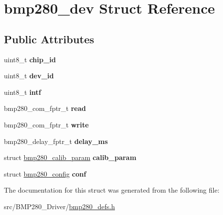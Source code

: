 \hypertarget{structbmp280__dev}{}\section{bmp280\+\_\+dev Struct Reference}
\label{structbmp280__dev}
\subsection*{Public Attributes}
\begin{DoxyCompactItemize}
\item 
\mbox{\label{structbmp280__dev_aad8e96e1b90095d7d29c304d1fd0eb7a}} 
uint8\+\_\+t {\bfseries chip\+\_\+id}
\item 
\mbox{\label{structbmp280__dev_a5904c4abdafcd25119f66872545af03a}} 
uint8\+\_\+t {\bfseries dev\+\_\+id}
\item 
\mbox{\label{structbmp280__dev_a086483a3cc1664868dbcc08bd84e5396}} 
uint8\+\_\+t {\bfseries intf}
\item 
\mbox{\label{structbmp280__dev_adb818ed44dfda1d195e99d7aa1752a38}} 
bmp280\+\_\+com\+\_\+fptr\+\_\+t {\bfseries read}
\item 
\mbox{\label{structbmp280__dev_a36c3231949d1a581274f92761da14bcf}} 
bmp280\+\_\+com\+\_\+fptr\+\_\+t {\bfseries write}
\item 
\mbox{\label{structbmp280__dev_ae854c30200407497fd96ce73ae2762a9}} 
bmp280\+\_\+delay\+\_\+fptr\+\_\+t {\bfseries delay\+\_\+ms}
\item 
\mbox{\label{structbmp280__dev_ade764b99d9fe1d3b273c74f3194c9d8f}} 
struct \mbox{\hyperlink{structbmp280__calib__param}{bmp280\+\_\+calib\+\_\+param}} {\bfseries calib\+\_\+param}
\item 
\mbox{\label{structbmp280__dev_a7a7f4b0cc9e0453862feb78c8b45856a}} 
struct \mbox{\hyperlink{structbmp280__config}{bmp280\+\_\+config}} {\bfseries conf}
\end{DoxyCompactItemize}


The documentation for this struct was generated from the following file\+:\begin{DoxyCompactItemize}
\item 
src/\+B\+M\+P280\+\_\+\+Driver/\mbox{\hyperlink{bmp280__defs_8h}{bmp280\+\_\+defs.\+h}}\end{DoxyCompactItemize}
